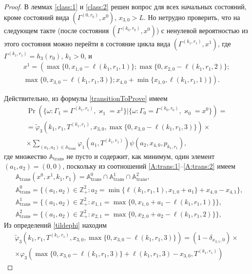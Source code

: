 \documentclass[a4paper,12pt,russian]{extarticle}
\begin{document}
\begin{proof}
В леммах \eqref{class:1} и \eqref{class:2} решен вопрос для всех начальных состояний, кроме состояний вида $(\Gamma^{(0,r_0)},x^0)$, $x_{3,0}>L$. Но нетрудно проверить, что на следующем такте (после состояния $(\Gamma^{(k_0,r_0)},x^0)$) с ненулевой вероятностью из этого состояния можно перейти в состояние цикла вида $(\Gamma^{(k_1,r_1)},x^1)$, где $\Gamma^{(k_1,r_1)} = h_3(r_0)$, $k_1>0$, и 
\begin{multline*}
x^{1}=\left(\max{\{0,x_{1,0} - \ell(k_1,r_1,1)\}};
\max{\{0,x_{2,0} - \ell(k_1,r_1,2)\}};\right.\\
\left.
\max{\{0,x_{3,0} - \ell(k_1,r_1,3)\}};
x_{4,0} + \min{\{x_{1,0}, \ell(k_1,r_1,1)\}}\right).
\end{multline*}


Действительно, из формулы \eqref{transitionToProve} имеем
\begin{multline*}
\Pr (\{\omega\colon \Gamma_{1}=\Gamma^{(k_1,r_1)},\varkappa_{1}=x^1 \}| \{\omega\colon \Gamma_{0}=\Gamma^{(k_0,r_0)},\varkappa_0=x^0\})=\\
=\widetilde{\varphi}_3(k_1,r_1,T^{(k_1,r_1)},x_{3,0},\max{\{0,x_{3,0} - \ell(k_1,r_1,3)\}})\times \\
\times
\sum_{(a_1,a_2)\in {\mathbb A}_{\mathrm{trans}}}\varphi_1(a_1,T^{(k_1,r_1)})  \psi(a_2,x_{4,0}, p_{k_1,r_1}),
\end{multline*}
где множество ${\mathbb A}_{\mathrm{trans}}$ не пусто и содержит, как минимум, один элемент $(a_1,a_2)=(0,0)$, поскольку из соотношений \eqref{A:trans:1}--\eqref{A:trans:2} имеем
\begin{align*}
&{\mathbb A}_{\mathrm{trans}}(x^0,x^1,k_1,r_1) = {\mathbb A}_{\mathrm{trans}}^0 \cap {\mathbb A}_{\mathrm{trans}}^1\cap {\mathbb A}_{\mathrm{trans}}^2,\\
&{\mathbb A}_{\mathrm{trans}}^0 = \{(a_1,a_2) \in \mathbb{Z}_+^2 \colon a_2 = \min{\{\ell(k_1,r_1,1), x_{1,0}+a_1}\} +x_{4,0}- x_{4,1}\},\\
&{\mathbb A}_{\mathrm{trans}}^1 = \{(a_1,a_2) \in \mathbb{Z}_+^2 \colon x_{1,1}=\max{\{0,x_{1,0}+a_1-\ell(k_1,r_1,1)\}}\},\\
& {\mathbb A}_{\mathrm{trans}}^2 = \{(a_1,a_2) \in \mathbb{Z}_+^2 \colon  x_{2,1} =\max{\{0,x_{2,0}+a_2-\ell(k_1,r_1,2)\}}\},
\end{align*}
Из определений \eqref{tildephi} находим
\begin{multline*}
\widetilde{\varphi}_3(k_1,r_1,T^{(k_1,r_1)},x_{3,0},\max{\{0,x_{3,0} - \ell(k_1,r_1,3)\}}) = (1-\delta_{x_{3,1},0}) \times \\\times\varphi_3(\max{\{0,x_{3,0} - \ell(k_1,r_1,3)\}} + \ell (k_1,r_1,3) - x_{3,0},T^{(k_1,r_1)} ) 

\end{multline*}
\end{proof}
\end{document}
